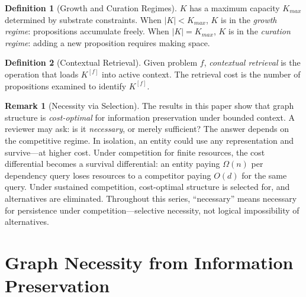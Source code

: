 \documentclass[11pt]{article}
\theoremstyle{definition}
\newtheorem{definition}{Definition}
\newtheorem*{remark}{Remark}
\begin{document}
\begin{definition}[Growth and Curation Regimes]
\label{def:regimes}
$K$ has a maximum capacity $K_{max}$ determined by substrate constraints.
When $|K| < K_{max}$, $K$ is in the \emph{growth regime}: propositions
accumulate freely. When $|K| = K_{max}$, $K$ is in the \emph{curation
regime}: adding a new proposition requires making space.
\end{definition}

\begin{definition}[Contextual Retrieval]
\label{def:retrieval}
Given problem $f$, \emph{contextual retrieval} is the operation that
loads $K^{[f]}$ into active context. The retrieval cost is the number of
propositions examined to identify $K^{[f]}$.
\end{definition}

\begin{remark}[Necessity via Selection]
\label{rem:necessity}
The results in this paper show that graph structure is
\emph{cost-optimal} for information preservation under bounded context.
A reviewer may ask: is it \emph{necessary}, or merely sufficient? The
answer depends on the competitive regime. In isolation, an entity could
use any representation and survive---at higher cost. Under competition
for finite resources, the cost differential becomes a survival
differential: an entity paying $\Omega(n)$ per dependency query loses
resources to a competitor paying $O(d)$ for the same query. Under
sustained competition, cost-optimal structure is selected for, and
alternatives are eliminated. Throughout this series, ``necessary'' means
necessary for persistence under competition---selective necessity, not
logical impossibility of alternatives.
\end{remark}

\section{Graph Necessity from Information Preservation}
\label{sec:info}
\end{document}
